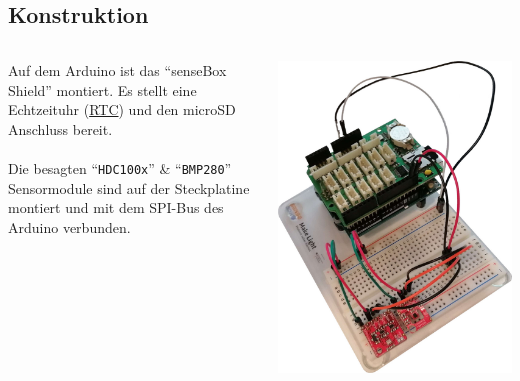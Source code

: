 \documentclass[ngerman]{schoolPres}
\begin{document}
  \subsection{Konstruktion}%
  \begin{frame}
    \begin{columns}[c]
      \begin{column}{.5\linewidth}
        Auf dem Arduino ist das \enquote{senseBox Shield} montiert.
        Es stellt eine Echtzeituhr (\href{https://de.wikipedia.org/wiki/Echtzeituhr}{RTC}) und den microSD Anschluss bereit.\\~\\

        Die besagten \enquote{\texttt{HDC100x}} \& \enquote{\texttt{BMP280}} Sensormodule sind auf der Steckplatine montiert und mit dem SPI-Bus des Arduino verbunden.
      \end{column}
      \begin{column}{.5\linewidth}
        \centering
        \includegraphics[height=.8\textheight]{media/board.jpg}
      \end{column}
    \end{columns}

  \end{frame}
\end{document}
